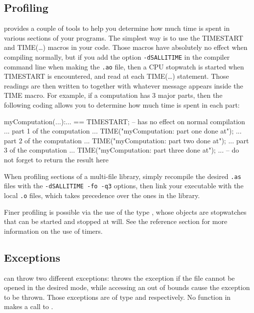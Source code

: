 \subsection{Profiling}
\salli provides a couple of tools to help you determine how much time is
spent in various sections of your programs. The simplest way is to use
the TIMESTART and TIME(\dots) macros in your code. Those macros have
absolutely no effect when compiling normally, but if you add the option
{\tt -dSALLITIME} in the compiler command line when making the {\tt .ao}
file, then a CPU stopwatch is started when TIMESTART is encountered,
and read at each TIME(\dots) statement. Those readings are then written
to  together with whatever message appears inside
the TIME macro. For example, if a computation has 3 major parts, then the
following coding allows you to determine how much time is spent in each
part:
\begin{ttyout}
myComputation(...):... == {
    TIMESTART;                  -- has no effect on normal compilation
    ... part 1 of the computation ...
    TIME("myComputation: part one done at");
    ... part 2 of the computation ...
    TIME("myComputation: part two done at");
    ... part 3 of the computation ...
    TIME("myComputation: part three done at");
    ...                         -- do not forget to return the result here
}
\end{ttyout}
When profiling sections of a multi-file library, simply recompile the
desired {\tt .as} files with the {\tt -dSALLITIME -fo -q3} options, then link
your executable with the local {\tt .o} files, which takes precedence over
the ones in the library.

Finer profiling is possible via the use of the type , whose
objects are stopwatches that can be started and stopped at will. See the
reference section for more information on the use of timers.

\subsection{Exceptions}
\salli can throw two different exceptions: 
throws the exception  if the file cannot
be opened in the desired mode, while accessing an 
out of bounds cause the exception  to
be thrown. Those exceptions are of type 
and  respectively.
No function in \salli makes a call to .
